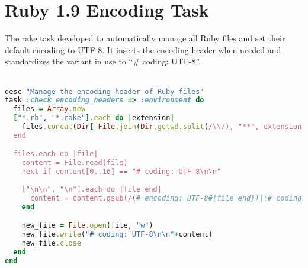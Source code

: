 \chapter{Ruby 1.9 Encoding Task} %
\label{ap:ruby19_encoding_patch}

The rake task developed to automatically manage all Ruby files and set their default encoding to UTF-8. It inserts the encoding header when needed and standardizes the variant in use to ``\# coding: UTF-8''.\\\\

\begin{lstlisting}[language=ruby]
desc "Manage the encoding header of Ruby files"
task :check_encoding_headers => :environment do
  files = Array.new
  ["*.rb", "*.rake"].each do |extension|
    files.concat(Dir[ File.join(Dir.getwd.split(/\\/), "**", extension) ])
  end

  files.each do |file|
    content = File.read(file)
    next if content[0..16] == "# coding: UTF-8\n\n"
    
    ["\n\n", "\n"].each do |file_end|
      content = content.gsub(/(# encoding: UTF-8#{file_end})|(# coding: UTF-8#{file_end})|(# -*- coding: UTF-8 -*-#{file_end})/i, "")
    end

    new_file = File.open(file, "w")
    new_file.write("# coding: UTF-8\n\n"+content)
    new_file.close
  end
end

\end{lstlisting}
